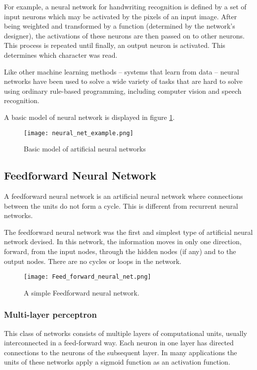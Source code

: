 \documentclass[14pt,a4paper]{extarticle}
\begin{document}
For example, a neural network for handwriting recognition is defined by a set of input neurons which may be activated by the pixels of an input image. After being weighted and transformed by a function (determined by the network's designer), the activations of these neurons are then passed on to other neurons. This process is repeated until finally, an output neuron is activated. This determines which character was read.

Like other machine learning methods – systems that learn from data – neural networks have been used to solve a wide variety of tasks that are hard to solve using ordinary rule-based programming, including computer vision and speech recognition.

A basic model of neural network is displayed in figure \ref{fig:neural_net_model}.

		\begin{figure}[H]
			\texttt{[image: neural\_net\_example.png]}
			\caption{Basic model of artificial neural networks}
			\label{fig:neural_net_model}
		\end{figure}
	
	\subsection{Feedforward Neural Network}
	
	A feedforward neural network is an artificial neural network where connections between the units do not form a cycle. This is different from recurrent neural networks.

The feedforward neural network was the first and simplest type of artificial neural network devised. In this network, the information moves in only one direction, forward, from the input nodes, through the hidden nodes (if any) and to the output nodes. There are no cycles or loops in the network.

		\begin{figure}[H]
			\texttt{[image: Feed\_forward\_neural\_net.png]}
			\caption{A simple Feedforward neural network.}
		\end{figure}
		
		
		\subsubsection{Multi-layer perceptron}
		This class of networks consists of multiple layers of computational units, usually interconnected in a feed-forward way. Each neuron in one layer has directed connections to the neurons of the subsequent layer. In many applications the units of these networks apply a sigmoid function as an activation function.
\end{document}
